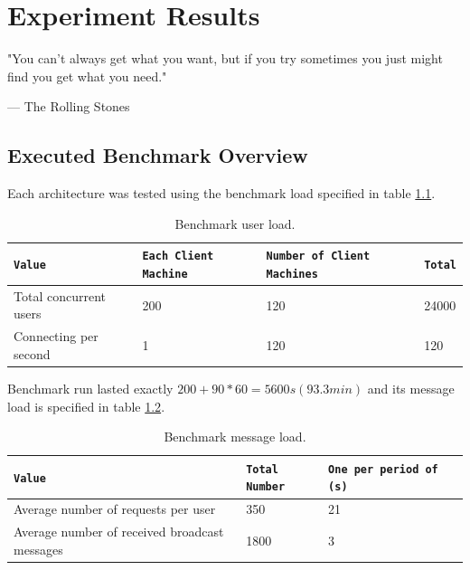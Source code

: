 \documentclass{uvamscse}
\begin{document}
\chapter{Experiment Results}\label{Experiment Results}

\epigraph{"You can't always get what you want, but if you try sometimes you just might find
you get what you need."}{--- The Rolling Stones}

\section{Executed Benchmark Overview}

Each architecture was tested using the benchmark load specified in table \ref{table:benchload}.

\begin{table}[H]
\begin{center}
\begin{tabular}{llll}
  \texttt{Value}          & \texttt{Each Client Machine}        & \texttt{Number of Client Machines}  & \texttt{Total}\\
  \hline
  Total concurrent users  & 200                         & 120                         & 24000         \\
  Connecting per second   & 1                           & 120                         & 120           \\
\end{tabular}
\end{center}
\caption{Benchmark user load.}
\label{table:benchload}
\end{table}

Benchmark run lasted exactly $200 + 90 * 60 = 5600s (93.3min)$ and its message load is specified in table \ref{table:benchload2}.

\begin{table}[H]
\begin{center}
\begin{tabular}{llll}
  \texttt{Value}          & \texttt{Total Number}        & \texttt{One per period of (s)} \\
  \hline
  Average number of requests per user  & 350   & 21\\
  Average number of received broadcast messages  & 1800   & 3                     \\
\end{tabular}
\end{center}
\caption{Benchmark message load.}
\label{table:benchload2}
\end{table}
\end{document}
